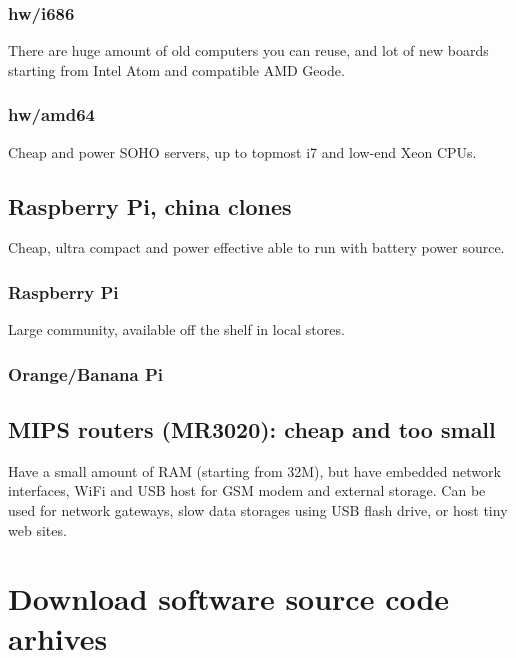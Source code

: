 \subsubsection{hw/i686}

There are huge amount of old computers you can reuse, and lot of new boards
starting from Intel Atom and compatible AMD Geode.

\subsubsection{hw/amd64}

Cheap and power SOHO servers, up to topmost i7 and low-end Xeon CPUs.

\subsection{Raspberry Pi, china clones}

Cheap, ultra compact and power effective able to run with battery power source.

\subsubsection{Raspberry Pi}

Large community, available off the shelf in local stores.

\subsubsection{Orange/Banana Pi}
\clearpage

\subsection{MIPS routers (MR3020): cheap and too small}

Have a small amount of RAM (starting from 32M), but have embedded network
interfaces, WiFi and USB host for GSM modem and external storage. Can be used
for network gateways, slow data storages using USB flash drive, or host tiny web
sites.

\section{Download software source code arhives}

